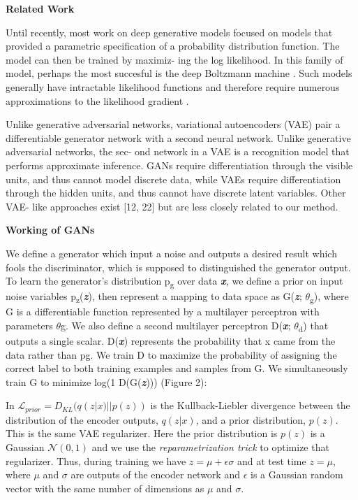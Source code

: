 \documentclass{article}
\begin{document}
\medskip
\begin{center}
    {\Large{\textbf{Related Work}}}
\end{center}
Until recently, most work on deep generative models focused on models that provided a parametric
specification of a probability distribution function. The model can then be trained by maximiz-
ing the log likelihood. In this family of model, perhaps the most succesful is the deep Boltzmann
machine . Such models generally have intractable likelihood functions and therefore require
numerous approximations to the likelihood gradient .

Unlike generative adversarial networks, variational autoencoders (VAE) pair a differentiable
generator network with a second neural network. Unlike generative adversarial networks, the sec-
ond network in a VAE is a recognition model that performs approximate inference. GANs require
differentiation through the visible units, and thus cannot model discrete data, while VAEs require
differentiation through the hidden units, and thus cannot have discrete latent variables. Other VAE-
like approaches exist [12, 22] but are less closely related to our method.
\medskip


\begin{center}
    {\Large{\textbf{Working of GANs}}}
\end{center}
We define a generator which input a noise and outputs a desired result which fools the discriminator, which is supposed to distinguished the generator output. To learn the generator’s distribution p\textsubscript{g} over data \textbf{\textit{x}}, we define a prior on input noise variables p\textsubscript{z}(\textbf{\textit{z}}), then represent a mapping to data space as G(\textbf{\textit{z}}; $\theta$\textsubscript{g}), where G is a differentiable function represented by a multilayer perceptron with parameters $\theta$g. We also define a
second multilayer perceptron D(\textbf{\textit{x}}; $\theta$\textsubscript{d}) that outputs a single scalar. D(\textbf{\textit{x}}) represents the probability
that x came from the data rather than pg. We train D to maximize the probability of assigning the
correct label to both training examples and samples from G. We simultaneously train G to minimize
log(1 D(G(\textbf{\textit{z}}))) (Figure 2):

In $\mathcal{L}_{prior} = D_{KL}(q(z|x)||p(z))$ is the Kullback-Liebler divergence between the distribution of the encoder outputs, $q(z|x)$,
and a prior distribution, $p(z)$.
This is the same VAE regularizer. Here the prior distribution is $p(z)$ is a Gaussian $\mathcal{N}(0, 1)$ and we use the \textit{reparametrization trick} \cite{VAE}
to optimize that regularizer. Thus, during training we have $z = \mu + \epsilon \sigma$ and at test time $z = \mu$, where $\mu$ and $\sigma$ are outputs
of the encoder network and $\epsilon$ is a Gaussian random vector with the same number of dimensions as $\mu$ and $\sigma$.
\end{document}
